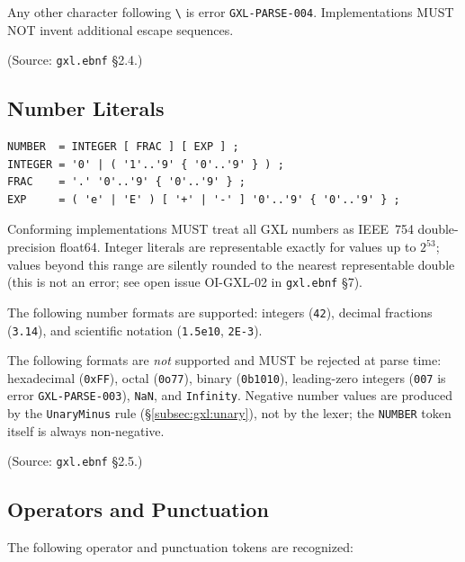 Any other character following \texttt{\textbackslash} is error
\texttt{GXL-PARSE-004}.
Implementations MUST NOT invent additional escape sequences.

(Source: \texttt{gxl.ebnf} \S2.4.)

\subsection{Number Literals}
\label{subsec:gxl:numbers}

\begin{verbatim}
NUMBER  = INTEGER [ FRAC ] [ EXP ] ;
INTEGER = '0' | ( '1'..'9' { '0'..'9' } ) ;
FRAC    = '.' '0'..'9' { '0'..'9' } ;
EXP     = ( 'e' | 'E' ) [ '+' | '-' ] '0'..'9' { '0'..'9' } ;
\end{verbatim}

Conforming implementations MUST treat all GXL numbers as IEEE~754
double-precision float64.
Integer literals are representable exactly for values up to $2^{53}$;
values beyond this range are silently rounded to the nearest representable
double (this is not an error;
see open issue OI-GXL-02 in \texttt{gxl.ebnf} \S7).

The following number formats are supported:
integers (\texttt{42}),
decimal fractions (\texttt{3.14}),
and scientific notation (\texttt{1.5e10}, \texttt{2E-3}).

The following formats are \emph{not} supported and MUST be rejected at parse time:
hexadecimal (\texttt{0xFF}),
octal (\texttt{0o77}),
binary (\texttt{0b1010}),
leading-zero integers (\texttt{007} is error \texttt{GXL-PARSE-003}),
\texttt{NaN}, and
\texttt{Infinity}.
Negative number values are produced by the \texttt{UnaryMinus} rule
(\S\ref{subsec:gxl:unary}), not by the lexer;
the \texttt{NUMBER} token itself is always non-negative.

(Source: \texttt{gxl.ebnf} \S2.5.)

\subsection{Operators and Punctuation}
\label{subsec:gxl:operators}

The following operator and punctuation tokens are recognized:

